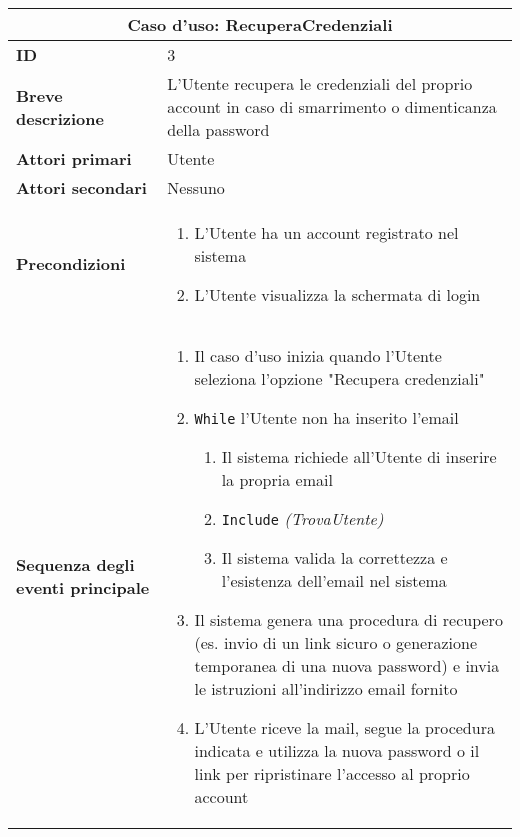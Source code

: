 \documentclass[a4paper]{report}
\begin{document}
\clearpage
\begin{table}[t!]
\vspace*{-6.5cm}
\renewcommand{\arraystretch}{1.9}
\begin{tabular}{|p{3.9cm}|p{9.9cm}|}
\hline
\multicolumn{2}{|c|}{\textbf{Caso d’uso: RecuperaCredenziali}} \\ \hline
\textbf{ID} & 3 \\ \hline
\textbf{Breve descrizione} & L’Utente recupera le credenziali del proprio account in caso di smarrimento o dimenticanza della password \\ \hline
\textbf{Attori primari} & Utente \\ \hline
\textbf{Attori secondari} & Nessuno \\ \hline
\textbf{Precondizioni} & \begin{enumerate}[leftmargin=14pt,label=\arabic*.,labelsep=0.5em,topsep=0pt,partopsep=0pt,parsep=0pt,itemsep=0pt]
    \item L'Utente ha un account registrato nel sistema
    \item L'Utente visualizza la schermata di login
\end{enumerate} \\ \hline
\textbf{Sequenza degli eventi principale} &
\begin{enumerate}[leftmargin=14pt,label=\arabic*.,labelsep=0.5em,topsep=0pt,partopsep=0pt,parsep=0pt,itemsep=0pt]
    \item Il caso d'uso inizia quando l'Utente seleziona l’opzione "Recupera credenziali"
    \item \texttt{While} l'Utente non ha inserito l'email
    \begin{enumerate}[label=\arabic{enumi}.\arabic*.,leftmargin=22pt,labelsep=0.5em,topsep=0pt,partopsep=0pt,parsep=0pt,itemsep=0pt]
        \item Il sistema richiede all’Utente di inserire la propria email
        \item \texttt{Include} \textit{(TrovaUtente)}
        \item Il sistema valida la correttezza e l’esistenza dell’email nel sistema
    \end{enumerate}
    \item Il sistema genera una procedura di recupero (es. invio di un link sicuro o generazione temporanea di una nuova password) e invia le istruzioni all’indirizzo email fornito
    \item L'Utente riceve la mail, segue la procedura indicata e utilizza la nuova password o il link per ripristinare l’accesso al proprio account

\end{enumerate}
\end{tabular}
\end{table}
\end{document}
